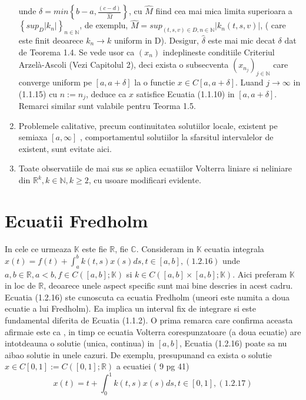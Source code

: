 \documentclass[a4paper,12pt,oneside]{report}
\begin{document}
\begin{enumerate}[1.]
		      unde \(\delta = min\left \{ b-a, \frac{\left ( c-d \right )}{\hat{M}} \right \}\), cu \(\hat{M}\) fiind cea mai mica limita superioara a \(\left \{ sup_{D} \left | k_{n} \right |\right \}_{n\in \mathbb{N}}\), de exemplu, \(\hat{M} = sup_{\left ( t,s,v \right )\in D, n \in \mathbb{N}}\left | k_{n}\left ( t,s,v \right ) \right |\), ( care este finit deoarece \(k_{n}\rightarrow k\) uniform in D). Desigur, \(\hat{\delta }\) este mai mic decat \({\delta }\) dat de Teorema 1.4. Se vede usor ca \(\left ( x_{n} \right )\)  indeplineste conditiile Criteriul Arzelà-Ascoli (Vezi Capitolul 2), deci exista o subsecventa \(\left ( x_{n_{j}} \right )_{j\in \mathbb{N}}\) care converge uniform pe \(\left [ a, a+ \delta  \right ]\) la o functie \(x \in C \left [ a, a+ \delta  \right ]\). Luand \(j\rightarrow \infty\) in (1.1.15) cu \(n:= n_{j}\), deduce ca \(x\) satisfice Ecuatia (1.1.10) in \(\left [ a,a+ \delta  \right ]\). Remarci similar sunt valabile pentru Teorma 1.5. 
		\item Problemele calitative, precum continuitatea solutiilor locale, existent pe semiaxa \(\left [ a, \infty  \right ]\) , comportamentul solutiilor la sfarsitul intervalelor de existent, sunt evitate aici. 
		\item Toate observatiile de mai sus se aplica ecuatiilor Volterra liniare si neliniare din \(\mathbb{R}^{k}, k\in \mathbb{N}, k\geq 2\), cu usoare modificari evidente. 
	\end{enumerate}
					
	\section{Ecuatii Fredholm}
					
	In cele ce urmeaza \(\mathbb{K}\) este fie \(\mathbb{R}\), fie \(\mathbb{C}\). Consideram in \(\mathbb{K}\) ecuatia integrala \(x\left ( t \right ) = f\left ( t \right ) + \int_{a}^{b}k\left ( t,s \right )x\left ( s \right )ds, t\in \left [ a,b \right ], (1.2.16)\)
	unde \(a,b \in \mathbb{R}, a< b, f\in C\left ( \left [ a,b \right ]; \mathbb{K}\right )\) si \(k\in C\left ( \left [ a,b \right ] \times \left [ a,b \right ]; \mathbb{K}\right ).\) Aici preferam \(\mathbb{K}\) in loc de \(\mathbb{R}\), deoarece unele aspect specific sunt mai bine descries in acest cadru. Ecuatia (1.2.16) ste cunoscuta ca ecuatia Fredholm (uneori este numita a doua ecuatie a lui Fredholm). Ea implica un interval fix de integrare si este fundamental diferita de Ecuatia (1.1.2).  O prima remarca care confirma aceasta afirmaie este ca , in timp ce ecuatia Volterra corespunzatoare (a doua ecuatie) are intotdeauna o solutie (unica, continua) in \(\left [ a,b \right ]\), Ecuatia (1.2.16) poate sa nu aibao solutie in unele cazuri. De exemplu, presupunand ca exista o solutie \(x \in C\left [ 0,1 \right ] := C\left ( \left [ 0,1 \right ]; \mathbb{R} \right )\) a ecuatiei ( 9 pg 41) 
	\begin{displaymath}
		x\left ( t \right ) = t + \int_{0}^{1} k\left ( t,s \right )x\left ( s \right )ds, t\in \left [ 0,1 \right ], (1.2.17)
	\end{displaymath}
					
\end{document}
